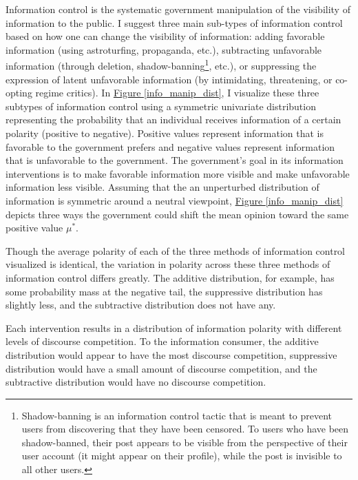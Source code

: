 \documentclass[11pt]{article}
\begin{document}
Information control is the systematic government manipulation of the visibility of information to the public. I suggest three main sub-types of information control based on how one can change the visibility of information: adding favorable information (using astroturfing, propaganda, etc.), subtracting unfavorable information (through deletion, shadow-banning\footnote{Shadow-banning is an information control tactic that is meant to prevent users from discovering that they have been censored. To users who have been shadow-banned, their post appears to be visible from the perspective of their user account (it might appear on their profile), while the post is invisible to all other users.}, etc.), or suppressing the expression of latent unfavorable information (by intimidating, threatening, or co-opting regime critics). In \hyperref[info_manip_dist]{Figure \ref*{info_manip_dist}}, I visualize these three subtypes of information control using a symmetric univariate distribution representing the probability that an individual receives information of a certain polarity (positive to negative). Positive values represent information that is favorable to the government prefers and negative values represent information that is unfavorable to the government. The government's goal in its information interventions is to make favorable information more visible and make unfavorable information less visible. Assuming that the an unperturbed distribution of information is symmetric around a neutral viewpoint, \hyperref[info_manip_dist]{Figure \ref*{info_manip_dist}} depicts three ways the government could shift the mean opinion toward the same positive value $\mu^*$.

Though the average polarity of each of the three methods of information control visualized is identical, the variation in polarity across these three methods of information control differs greatly. The additive distribution, for example, has some probability mass at the negative tail, the suppressive distribution has slightly less, and the subtractive distribution does not have any.

Each intervention results in a distribution of information polarity with different levels of discourse competition. To the information consumer, the additive distribution would appear to have the most discourse competition, suppressive distribution would have a small amount of discourse competition, and the subtractive distribution would have no discourse competition.
\end{document}
